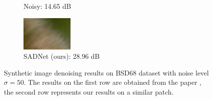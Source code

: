 \begin{figure}[t!]
\begin{subfigure}{0.28\textwidth}
            \caption{Noisy: 14.65 dB}
            \label{fig:bsd_noisy}
        \end{subfigure}\hfil %
        \begin{subfigure}{0.28\textwidth}
            \includegraphics[width=\linewidth]{images/bsd_out.png}
            \caption{SADNet (ours): 28.96 dB}
            \label{fig:bsd_out}
        \end{subfigure}\hfil %
    \caption{Synthetic image denoising results on BSD68 dataset with noise level $\sigma = 50$. The results on the first row are obtained from the paper \cite{10.1007/978-3-030-58577-8_11}, the second row represents our results on a similar patch.}
    \label{fig:kus}
\end{figure}


